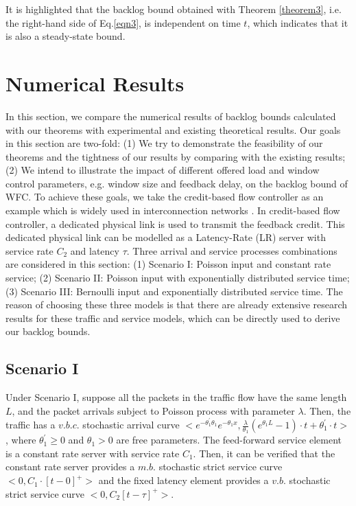 \documentclass[paper]{ieice}
\begin{document}
It is highlighted that the backlog bound obtained with Theorem \ref{theorem3}, i.e. the right-hand side of Eq.\ref{eqn3}, is
independent on time $t$, which indicates that it is also a steady-state bound.

\section{Numerical Results}\label{experiments}
In this section, we compare the numerical results of backlog bounds calculated with our theorems with experimental and existing theoretical results. Our goals in this section are two-fold: (1) We try to demonstrate the feasibility of our theorems and the tightness of our results by comparing with the existing results; (2) We intend to illustrate the impact of different offered load and window control parameters, e.g. window size and feedback delay, on the backlog bound of WFC. To achieve these goals, we take the credit-based flow controller as an example which is widely used in interconnection networks \cite{DaTo04}. In credit-based flow controller, a dedicated physical link is used to transmit the feedback credit. This dedicated physical link can be modelled as a Latency-Rate (LR) server \cite{StVa98} with service rate $C_2$ and latency $\tau$. Three arrival and service processes combinations are considered in this section: (1) Scenario I: Poisson input and constant rate service; (2) Scenario II: Poisson input with exponentially distributed service time; (3) Scenario III: Bernoulli input and exponentially distributed service time. The reason of choosing these three models is that there are already extensive research results for these traffic and service models, which can be directly used to derive our backlog bounds.

\subsection{Scenario I}
Under Scenario I, suppose all the packets in the traffic flow have the same length $L$, and the packet arrivals subject to Poisson process with parameter $\lambda$. Then, the traffic has a $v.b.c.$ stochastic arrival curve $<e^{-\theta_1^\prime\theta_1}e^{-\theta_1 x},\frac{\lambda}{\theta_1}(e^{\theta_1 L}-1)\cdot t+\theta_1^\prime\cdot t>$ \cite{jiang2010note}, where $\theta_1^\prime\geq 0$ and $\theta_1>0$ are free parameters. The feed-forward service element is a constant rate server with service rate $C_1$. Then, it can be verified that the constant rate server provides a $m.b.$ stochastic strict service curve $<0,C_1\cdot [t-0]^+>$ and the fixed latency element provides a $v.b.$ stochastic strict service curve $<0,C_2[t-\tau]^+>$.
\end{document}

